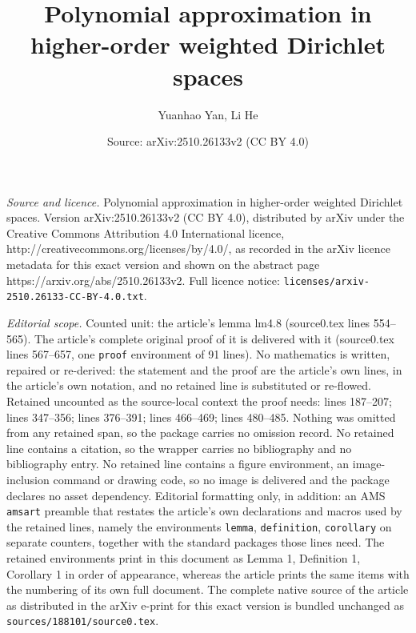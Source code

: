 \documentclass[10pt,a4paper]{amsart}
\title{Polynomial approximation in higher-order weighted Dirichlet spaces}
\author{Yuanhao Yan, Li He}
\date{Source: arXiv:2510.26133v2 (CC BY 4.0)}
\begin{document}
\maketitle

\noindent\emph{Source and licence.} Polynomial approximation in higher-order weighted Dirichlet spaces. Version arXiv:2510.26133v2 (CC BY 4.0), distributed by arXiv under the Creative Commons Attribution 4.0 International licence, http://creativecommons.org/licenses/by/4.0/, as recorded in the arXiv licence metadata for this exact version and shown on the abstract page https://arxiv.org/abs/2510.26133v2. Full licence notice: \texttt{licenses/arxiv-2510.26133-CC-BY-4.0.txt}.\par\smallskip

\noindent\textit{Editorial scope.} Counted unit: the article's lemma lm4.8 (source0.tex lines 554--565). The article's complete original proof of it is delivered with it (source0.tex lines 567--657, one \texttt{proof} environment of 91 lines). No mathematics is written, repaired or re-derived: the statement and the proof are the article's own lines, in the article's own notation, and no retained line is substituted or re-flowed.  Retained uncounted as the source-local context the proof needs: lines 187--207; lines 347--356; lines 376--391; lines 466--469; lines 480--485.  Nothing was omitted from any retained span, so the package carries no omission record.  No retained line contains a citation, so the wrapper carries no bibliography and no bibliography entry.  No retained line contains a figure environment, an image-inclusion command or drawing code, so no image is delivered and the package declares no asset dependency.  Editorial formatting only, in addition: an AMS \texttt{amsart} preamble that restates the article's own declarations and macros used by the retained lines, namely the environments \texttt{lemma}, \texttt{definition}, \texttt{corollary} on separate counters, together with the standard packages those lines need.  The retained environments print in this document as Lemma 1, Definition 1, Corollary 1 in order of appearance, whereas the article prints the same items with the numbering of its own full document.  The complete native source of the article as distributed in the arXiv e-print for this exact version is bundled unchanged as \texttt{sources/188101/source0.tex}.
\end{document}

